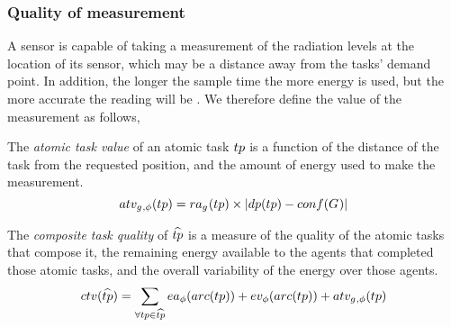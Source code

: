 \newcommand{\functionAtomicTaskQualitySignature}[2]{
	\functionSignature{atv_{\varAgent{}{}, \varTime{}{}}} {\varAtomicTask{}{}}
}
\newcommand{\functionCompositeTaskQuality}[2]{
	\functionSignature{ctv}{\varCompositeTask{}{}}
}
\newcommand{\functionSystemUtility}[2]{u(t)}
\subsubsection*{Quality of measurement}

A sensor is capable of taking a measurement of the radiation levels at the location of its sensor, which may be a distance away from the tasks' demand point. In addition, the longer the sample time the more energy is used, but the more accurate the reading will be \cite{dummy}. We therefore define the value of the measurement as follows,
\begin{definition}
	The \textit{atomic task value} of an atomic task $\varAtomicTask{}{}$ is a function of the distance of the task from the requested position, and the amount of energy used to make the measurement.
	\begin{equation}
		\functionAtomicTaskQualitySignature{}{} = \functionTaskResourceAllocation{}{} \times \funcSize{
				\functionTaskDemandPoint{}{} - \functionDeployment{}{}
		}{}
	\end{equation}
\end{definition}

\begin{definition}
	The \textit{composite task quality} of $\varCompositeTask{}{}$ is a measure of the quality of the atomic tasks that compose it, the remaining energy available to the agents that completed those atomic tasks, and the overall variability of the energy over those agents. 
	\begin{equation}
		\functionCompositeTaskQuality{}{} = 
		\sum_{\forall \varAtomicTask{}{} \in \varCompositeTask{}{}}
		\functionEnergyAvailable{\functionTaskArc{}{}}{}
		+ \functionEnergyVariability{\functionTaskArc{}{}}{}
		+ \functionAtomicTaskQualitySignature{}{}
	\end{equation}
\end{definition}
